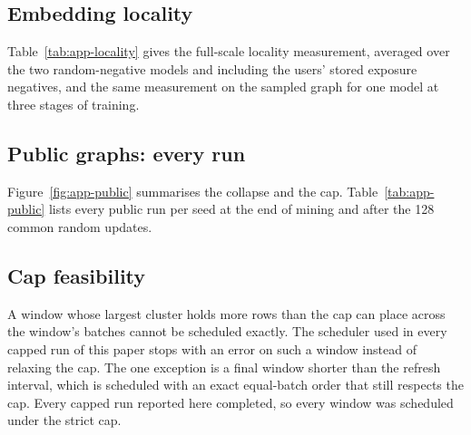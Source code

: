 \subsection{Embedding locality}
Table~\ref{tab:app-locality} gives the full-scale locality measurement, averaged over the two random-negative models and including the users' stored
exposure negatives, and the same measurement on the sampled graph for one model at
three stages of training.


\subsection{Public graphs: every run}
Figure~\ref{fig:app-public} summarises the collapse and the cap. Table~\ref{tab:app-public} lists every public run per seed at the end of mining and after the 128 common random updates.


\subsection{Cap feasibility}
A window whose largest cluster holds more rows than the cap can place across the window's batches cannot be scheduled exactly. The
scheduler used in every capped run of this paper stops with an error on such a window instead of relaxing the cap. The one exception is
a final window shorter than the refresh interval, which is scheduled with an exact equal-batch order that still respects the cap. Every
capped run reported here completed, so every window was scheduled under the strict cap.
